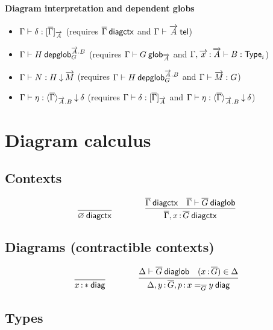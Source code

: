 \paragraph{Diagram interpretation and dependent globs}

\begin{small}
\begin{itemize}
\item ${\Gamma} \vdash {\delta} : {[ \overline{\Gamma} ]_{\overrightarrow{A}}}$
(requires ${\overline{\Gamma}} \: \mathsf{diagctx}$ and ${\Gamma} \vdash {\ensuremath{\overrightarrow{A}}} \: \mathsf{tel}$)
\item ${\Gamma} \vdash {H} \: \mathsf{depglob}^{\overrightarrow{A}.B}_{G}$
(requires ${\Gamma} \vdash {G} \: \mathsf{glob}_{\overrightarrow{A}}$ and ${\Gamma,\overrightarrow{x}\, {:}\, \overrightarrow{A}} \vdash {B} : {\mathsf{Type}_{i}}$)
\item ${\Gamma} \vdash {N} : {H}\mathbin{\downarrow}{\overrightarrow{M}}$
(requires ${\Gamma} \vdash {H} \: \mathsf{depglob}^{\overrightarrow{A}.B}_{G}$
and ${\Gamma} \vdash {\ensuremath{\overrightarrow{M}}} : {G}$)
\item ${\Gamma} \vdash {\eta} : {\langle \overline{\Gamma} \rangle_{\overrightarrow{A}.B}}\mathbin{\downarrow}{\delta}$
(requires ${\Gamma} \vdash {\delta} : {[ \overline{\Gamma} ]_{\overrightarrow{A}}}$
and ${\Gamma} \vdash {\eta} : {\langle \overline{\Gamma} \rangle_{\overrightarrow{A}.B}}\mathbin{\downarrow}{\delta}$)
\end{itemize}
\end{small}

\section{Diagram calculus}

\subsection{Contexts}

\begin{small}
  \[
  \infer{\wfdiagctx{\emptyctx}}{}
  \qquad\qquad
  \infer
  {\wfdiagctx{\diag\Gamma,\tptm{x}{\diag G}}}
  {\wfdiagctx{\diag\Gamma} & \wfdiaglob{\diag\Gamma}{\diag G}}\]
\end{small}

\subsection{Diagrams (contractible contexts)}

\begin{small}
  \[
  \infer{\wfdiag{\tptm{x}{\diagbase}}}{}
  \qquad\qquad
  \infer{\wfdiag{\Delta,\tptm{y}{\diag G},\tptm{p}{\homj{\diag{G}}{x}{y}}}}
  {\wfdiaglob{\Delta}{\diag G}
    & (\tptm{x}{\diag{G}}) \in \Delta}\]
\end{small}

\subsection{Types}

